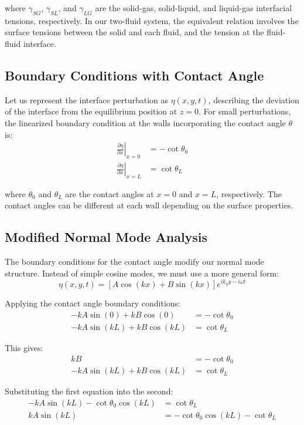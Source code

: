 \documentclass[12pt,a4paper]{article}
\begin{document}
where $\gamma_{SG}$, $\gamma_{SL}$, and $\gamma_{LG}$ are the solid-gas, solid-liquid, and liquid-gas interfacial tensions, respectively. In our two-fluid system, the equivalent relation involves the surface tensions between the solid and each fluid, and the tension at the fluid-fluid interface.

\subsection{Boundary Conditions with Contact Angle}

Let us represent the interface perturbation as $\eta(x,y,t)$, describing the deviation of the interface from the equilibrium position at $z = 0$. For small perturbations, the linearized boundary condition at the walls incorporating the contact angle $\theta$ is:
\begin{align}
\left.\frac{\partial \eta}{\partial x}\right|_{x=0} &= -\cot\theta_0 \\
\left.\frac{\partial \eta}{\partial x}\right|_{x=L} &= \cot\theta_L
\end{align}

where $\theta_0$ and $\theta_L$ are the contact angles at $x = 0$ and $x = L$, respectively. The contact angles can be different at each wall depending on the surface properties.

\subsection{Modified Normal Mode Analysis}
The boundary conditions for the contact angle modify our normal mode structure. Instead of simple cosine modes, we must use a more general form:
\begin{equation}
\eta(x,y,t) = [A\cos(kx) + B\sin(kx)]e^{ik_y y - i\omega t}
\end{equation}

Applying the contact angle boundary conditions:
\begin{align}
-kA\sin(0) + kB\cos(0) &= -\cot\theta_0 \\
-kA\sin(kL) + kB\cos(kL) &= \cot\theta_L
\end{align}

This gives:
\begin{align}
kB &= -\cot\theta_0 \\
-kA\sin(kL) + kB\cos(kL) &= \cot\theta_L
\end{align}

Substituting the first equation into the second:
\begin{align}
-kA\sin(kL) - \cot\theta_0\cos(kL) &= \cot\theta_L \\
kA\sin(kL) &= -\cot\theta_0\cos(kL) - \cot\theta_L
\end{align}
\end{document}
